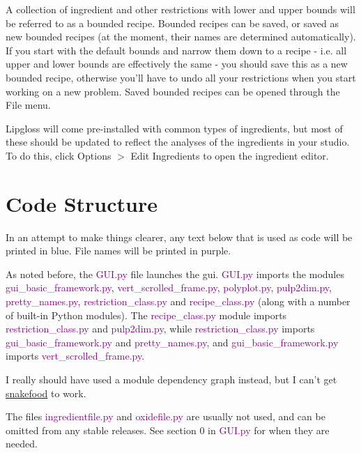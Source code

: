 \documentclass[a4paper,10pt]{article}
\def\green{\textcolor{Purple}}
\begin{document}
A collection of ingredient and other restrictions with lower and upper bounds will be referred to as a bounded recipe. Bounded recipes can be saved, or saved as new bounded recipes (at the moment, their names are determined automatically). If you start with the default bounds and narrow them down to a recipe - i.e. all upper and lower bounds are effectively the same - you should save this as a new bounded recipe, otherwise you'll have to undo all your restrictions when you start working on a new problem. Saved bounded recipes can be opened through the File menu.

Lipgloss will come pre-installed with common types of ingredients, but most of these should be updated to reflect the analyses of the ingredients in your studio. To do this, click Options $>$ Edit Ingredients to open the ingredient editor.

\section{Code Structure}
In an attempt to make things clearer, any text below that is used as code will be printed in blue. File names will be printed in purple.

As noted before, the \green{GUI.py} file launches the gui. \green{GUI.py} imports the modules \green{gui\_basic\_framework.py}, \green{vert\_scrolled\_frame.py}, \green{polyplot.py}, \newline
\green{pulp2dim.py}, \green{pretty\_names.py}, \green{restriction\_class.py} and \green{recipe\_class.py} (along with a number of built-in Python modules). The \green{recipe\_class.py} module imports \green{restriction\_class.py} and \green{pulp2dim.py}, while \green{restriction\_class.py} imports \green{gui\_basic\_framework.py} and \green{pretty\_names.py}, and \green{gui\_basic\_framework.py} imports \green{vert\_scrolled\_frame.py}.

I really should have used a module dependency graph instead, but I can't get \href{http://furius.ca/snakefood/}{snakefood} to work.

The files \green{ingredientfile.py} and \green{oxidefile.py} are usually not used, and can be omitted from any stable releases. See section 0 in \green{GUI.py} for when they are needed.
\end{document}
